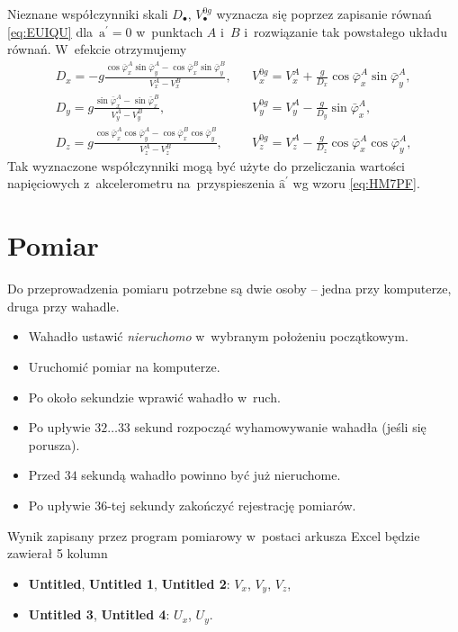 \documentclass[paper=a4,DIV=12]{lpas}
\newcommand{\brm}[1]{\bm{\mathrm{#1}}}
\begin{document}
Nieznane współczynniki skali $D_{\bullet}$, $V_{\bullet}^{0g}$ wyznacza się
poprzez zapisanie równań \eqref{eq:EUIQU} dla~$\brm{a}^{\prime} = \brm{0}$
w~punktach $A$ i~$B$ i~rozwiązanie tak powstałego układu równań. W~efekcie
otrzymujemy
\begin{subequations}
  \label{eq:GN30K}
  \begin{align}
    & D_x = -g \frac{ \cos{\bar{\varphi}_x^A}\sin{\bar{\varphi}_y^A} -\cos{\bar{\varphi}_x^B}\sin{\bar{\varphi}_y^B} }
                    { V_x^A - V_x^B }, &
    & V_x^{0g} = V_x^A +\frac{g}{D_x} \cos{\bar{\varphi}_x^A}\sin{\bar{\varphi}_y^A}, &
    \label{eq:L8MQV}
    \\
    & D_y = g \frac{ \sin{\bar{\varphi}_x^A} - \sin{\bar{\varphi}_x^B} }
                   { V_y^A - V_y^B }, &
    & V_y^{0g} = V_y^A - \frac{g}{D_y}\sin{\bar{\varphi}_x^A}, &
    \label{eq:OAGGF}
    \\
    & D_z = g \frac{ \cos{\bar{\varphi}_x^A}\cos{\bar{\varphi}_y^A} -\cos{\bar{\varphi}_x^B}\cos{\bar{\varphi}_y^B} }
                    { V_z^A - V_z^B }, &
    & V_z^{0g} = V_z^A - \frac{g}{D_z} \cos{\bar{\varphi}_x^A}\cos{\bar{\varphi}_y^A}, &
    \label{eq:JZ38T}
  \end{align}
\end{subequations}
Tak wyznaczone współczynniki mogą być użyte do przeliczania wartości
napięciowych z~akcelerometru na~przyspieszenia $\hat{\brm{a}}^{\prime}$ 
wg wzoru \eqref{eq:HM7PF}.

\section{Pomiar}
\label{sec:CKUHT}

Do przeprowadzenia pomiaru potrzebne są dwie osoby -- jedna przy komputerze,
druga przy wahadle.
\begin{itemize}
  \item Wahadło ustawić {\em nieruchomo} w~wybranym położeniu początkowym.
  \item Uruchomić pomiar na komputerze.
  \item Po około sekundzie wprawić wahadło w~ruch.
  \item Po upływie $32\dots33$ sekund rozpocząć wyhamowywanie wahadła (jeśli się porusza).
  \item Przed $34$ sekundą wahadło powinno być już nieruchome.
  \item Po upływie $36$-tej sekundy zakończyć rejestrację pomiarów.
\end{itemize}
Wynik zapisany przez program pomiarowy w~postaci arkusza Excel będzie zawierał
5 kolumn
\begin{itemize}
  \item \textbf{Untitled}, \textbf{Untitled 1}, \textbf{Untitled 2}: $V_x$, $V_y$, $V_z$,
  \item \textbf{Untitled 3}, \textbf{Untitled 4}: $U_x$, $U_y$.
\end{itemize}
\end{document}
